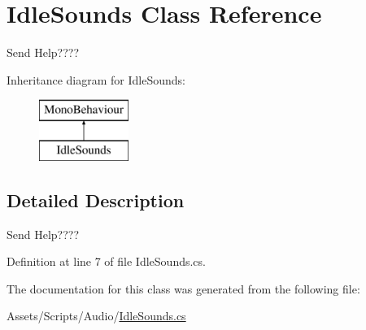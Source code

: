\hypertarget{class_idle_sounds}{}\section{Idle\+Sounds Class Reference}
\label{class_idle_sounds}


Send Help????  


Inheritance diagram for Idle\+Sounds\+:\begin{figure}[H]
\begin{center}
\leavevmode
\includegraphics[height=2.000000cm]{class_idle_sounds}
\end{center}
\end{figure}


\subsection{Detailed Description}
Send Help???? 



Definition at line 7 of file Idle\+Sounds.\+cs.



The documentation for this class was generated from the following file\+:\begin{DoxyCompactItemize}
\item 
Assets/\+Scripts/\+Audio/\mbox{\hyperlink{_idle_sounds_8cs}{Idle\+Sounds.\+cs}}\end{DoxyCompactItemize}
